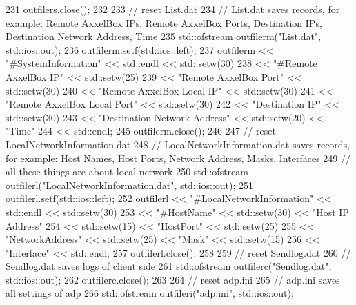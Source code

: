 \begin{DoxyCode}
231         outfilers.close();
232 
233         \textcolor{comment}{// reset List.dat}
234         \textcolor{comment}{// List.dat saves records, for example: Remote AxxelBox IPs, Remote AxxelBox Ports, Destination
       IPs, Destination Network Address, Time}
235         std::ofstream outfilerm(\textcolor{stringliteral}{"List.dat"}, std::ios::out);
236         outfilerm.setf(std::ios::left);
237         outfilerm << \textcolor{stringliteral}{"#SystemInformation"} << std::endl << std::setw(30)
238                 << \textcolor{stringliteral}{"#Remote AxxelBox IP"} << std::setw(25)
239                 << \textcolor{stringliteral}{"Remote AxxelBox Port"} << std::setw(30)
240                 << \textcolor{stringliteral}{"Remote AxxelBox Local IP"} << std::setw(30)
241                 << \textcolor{stringliteral}{"Remote AxxelBox Local Port"} << std::setw(30)
242                 << \textcolor{stringliteral}{"Destination IP"} << std::setw(30)
243                 << \textcolor{stringliteral}{"Destination Network Address"} << std::setw(20) << \textcolor{stringliteral}{"Time"}
244                 << std::endl;
245         outfilerm.close();
246 
247         \textcolor{comment}{// reset LocalNetworkInformation.dat}
248         \textcolor{comment}{// LocalNetworkInformation.dat saves records, for example: Host Names, Host Ports, Network Address,
       Masks, Interfaces}
249         \textcolor{comment}{// all these things are about local network}
250         std::ofstream outfilerl(\textcolor{stringliteral}{"LocalNetworkInformation.dat"}, std::ios::out);
251         outfilerl.setf(std::ios::left);
252         outfilerl << \textcolor{stringliteral}{"#LocalNetworkInformation"} << std::endl << std::setw(30)
253                 << \textcolor{stringliteral}{"#HostName"} << std::setw(30) << \textcolor{stringliteral}{"Host IP Address"}
254                 << std::setw(15) << \textcolor{stringliteral}{"HostPort"} << std::setw(25)
255                 << \textcolor{stringliteral}{"NetworkAddress"} << std::setw(25) << \textcolor{stringliteral}{"Mask"} << std::setw(15)
256                 << \textcolor{stringliteral}{"Interface"} << std::endl;
257         outfilerl.close();
258 
259         \textcolor{comment}{// reset Sendlog.dat}
260         \textcolor{comment}{// Sendlog.dat saves logs of client side}
261         std::ofstream outfilerc(\textcolor{stringliteral}{"Sendlog.dat"}, std::ios::out);
262         outfilerc.close();
263 
264         \textcolor{comment}{// reset adp.ini}
265         \textcolor{comment}{// adp.ini saves all settings of adp}
266         std::ofstream outfileri(\textcolor{stringliteral}{"adp.ini"}, std::ios::out);

\end{DoxyCode}
